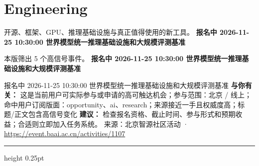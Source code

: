 \documentclass[10.5pt]{ctexart}
\begin{document}
\section*{Engineering}
{\color{ormuted} 开源、框架、GPU、推理基础设施与真正值得使用的新工具。}
\vspace{2mm}
{\LARGE\bfseries 报名中 2026-11-25 10:30:00 世界模型统一推理基础设施和大规模评测基准}\par
\vspace{1mm}
{\color{ormuted} 本版筛出 5 个高信号事件。}
\vspace{3mm}
{\Large\bfseries 报名中 2026-11-25 10:30:00 世界模型统一推理基础设施和大规模评测基准}\par
报名中 2026-11-25 10:30:00 世界模型统一推理基础设施和大规模评测基准
\textbf{与你有关：} 这是当前用户可实际参与或申请的高可触达机会；参与范围：北京 / 线上；命中用户订阅版面：opportunity、ai、research；来源接近一手且权威度高；标题/正文包含高信号变化
\textbf{建议：} 检查报名资格、截止时间、参与形式和预期收益；合适则立即加入任务系统。
{\footnotesize\color{ormuted} 来源：北京智源社区活动 · \url{https://event.baai.ac.cn/activities/1107}}
\vspace{4mm}
\hrule height 0.25pt
\vspace{3mm}
\end{document}
